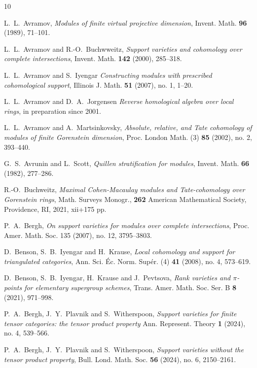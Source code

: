 \documentclass{amsart}[11pt]
\numberwithin{equation}{section}
\theoremstyle{plain}
\newtheorem*{Main Theorem}{Main Theorem}
\theoremstyle{definition}
\theoremstyle{remark}
\numberwithin{equation}{theorem}
\begin{document}
\nocite{*}

\begin{thebibliography}{10}

 L.~L.~Avramov, \emph{Modules of finite virtual projective dimension}, 
Invent. Math. {\bf 96} (1989), 71--101.

 L.~L.~Avramov and R.-O.~Buchwweitz,
{\em Support varieties and cohomology over complete intersections},
Invent. Math. {\bf 142} (2000), 285--318.

 L.~L.~Avramov and S.~Iyengar {\em Constructing modules with prescribed cohomological support}, Illinois J. Math. {\bf 51} (2007), no. 1, 1--20.

 L.~L.~Avramov and D.~A.~Jorgensen {\em Reverse homological algebra over local rings},
in preparation since 2001.

 L.~L.~Avramov and A.~Martsinkovsky,
{\em Absolute, relative, and Tate cohomology of modules of finite Gorenstein dimension},
Proc. London Math. (3) {\bf 85} (2002), no. 2, 393--440.

 G.~S.~Avrunin and L.~Scott, \emph{Quillen stratification for modules},
Invent. Math. {\bf 66} (1982), 277--286.

 R.-O.~Buchweitz,
{\em Maximal Cohen-Macaulay modules and Tate-cohomology over Gorenstein rings},
Math. Surveys Monogr., {\bf 262}
American Mathematical Society, Providence, RI, 2021, xii+175 pp.

 P.~A.~Bergh, {\em On support varieties for modules over complete intersections},
Proc. Amer. Math. Soc. 135 (2007), no. 12, 3795--3803.

 D.~Benson, S.~B.~Iyengar and H.~Krause, \emph{Local cohomology and support for triangulated categories},
Ann. Sci. Éc. Norm. Supér. (4) {\bf 41} (2008), no. 4, 573--619.

 D.~Benson, S.~B.~Iyengar, H.~Krause and J.~Pevtsova, \emph{Rank varieties and  $\pi$-points for elementary supergroup schemes},
Trans. Amer. Math. Soc. Ser. B {\bf 8} (2021), 971--998.

 P.~A.~Bergh, J.~Y.~Plavnik and S.~Witherspoon, \emph{Support varieties for finite tensor categories: the tensor product property}
Ann. Represent. Theory {\bf 1} (2024), no. 4, 539--566.

 P.~A.~Bergh, J.~Y.~Plavnik and S.~Witherspoon, \emph{Support varieties without the tensor product property},
Bull. Lond. Math. Soc. {\bf 56} (2024), no. 6, 2150--2161.


\end{thebibliography}
\end{document}
